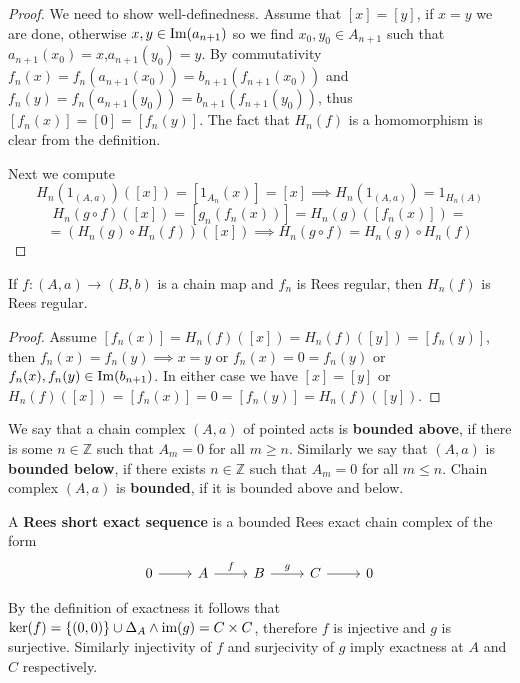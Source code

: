 \begin{proof}[Proof]
    We need to show well-definedness. Assume that $[x]=[y]$, if $x=y$ we are done, otherwise $x,y\in\mathrm{Im}(a_{n+1})$ so we 
    find $x_0,y_0\in A_{n+1}$ such that $a_{n+1}(x_0) = x$,$a_{n+1}(y_0)=y$. By commutativity $f_n(x)=f_n(a_{n+1}(x_0))=b_{n+1}(f_{n+1}(x_0))$
    and $f_n(y) = f_n(a_{n+1}(y_0))=b_{n+1}(f_{n+1}(y_0))$, thus $[f_n(x)]=[0]=[f_n(y)]$. The fact that $H_n(f)$ is a homomorphism 
    is clear from the definition.\par 
    Next we compute
    \[
        H_n(1_{(A,a)})([x]) = [1_{A_n}(x)] = [x] \implies H_n(1_{(A,a)}) = 1_{H_n(A)}
    \]
    \[
        H_n(g\circ f)([x]) = [g_n(f_n(x))] = H_n(g)([f_n(x)]) =
    \]
    \[
         =(H_n(g)\circ H_n(f))([x]) \implies H_n(g\circ f) = H_n(g)\circ H_n(f)
    \]
\end{proof}
\begin{lemma}
    If $f: (A,a)\to (B,b)$ is a chain map and $f_n$ is Rees regular, then $H_n(f)$ is Rees regular.
\end{lemma}
\begin{proof}[Proof]
    Assume $[f_n(x)]=H_n(f)([x])=H_n(f)([y])=[f_n(y)]$, then $f_n(x)=f_n(y) \implies x=y$ or $f_n(x)=0=f_n(y)$ or 
    $f_n(x),f_n(y)\in\mathrm{Im}(b_{n+1})$. In either case we have $[x]=[y]$ or $H_n(f)([x])=[f_n(x)]=0=[f_n(y)]=H_n(f)([y])$.
\end{proof}
\begin{definition}
    We say that a chain complex $(A,a)$ of pointed acts is \textbf{bounded above}, if there is some $n\in\mathbb{Z}$ such that 
    $A_m=0$ for all $m\geq n$. Similarly we say that $(A,a)$ is \textbf{bounded below}, if there exists $n\in\mathbb{Z}$ such that 
    $A_m=0$ for all $m\leq n$. Chain complex $(A,a)$ is \textbf{bounded}, if it is bounded above and below.
\end{definition}
\begin{definition}
    A \textbf{Rees short exact sequence} is a bounded Rees exact chain complex of the form
    \[\begin{tikzcd}
        0 & A & B & C & 0
        \arrow[from=1-1, to=1-2]
        \arrow["f", from=1-2, to=1-3]
        \arrow["g", from=1-3, to=1-4]
        \arrow[from=1-4, to=1-5]
    \end{tikzcd}\]
\end{definition}
\begin{remark}
    By the definition of exactness it follows that $\mathrm{ker}(f) = \{(0,0)\}\cup\Delta_A \land \text{im}(g)= C\times C$, therefore 
    $f$ is injective and $g$ is surjective. Similarly injectivity of $f$ and surjecivity of $g$ imply exactness at $A$ 
    and $C$ respectively.
\end{remark}
